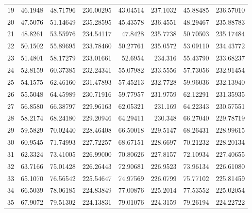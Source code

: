 \begin{table}[ht!]
{\begin{tabular}{@{}rrrrrrrr@{}}
19 & 46.1948 & 48.71796 & 236.00295 & 43.04514 & 237.1032 & 45.88485 & 236.57010 \\
20 & 47.5076 & 51.14649 & 235.28595 & 45.43578 & 236.4551 & 48.29467 & 235.88783 \\
21 & 48.8261 & 53.55976 & 234.54117 & 47.8428  & 235.7738 & 50.70503 & 235.17484 \\
22 & 50.1502 & 55.89695 & 233.78460 & 50.27761 & 235.0572 & 53.09110 & 234.43772 \\
23 & 51.4801 & 58.17279 & 233.01661 & 52.6954  & 234.316  & 55.43790 & 233.68237 \\
24 & 52.8159 & 60.37385 & 232.24341 & 55.07982 & 233.5556 & 57.73056 & 232.91454 \\
25 & 54.1575 & 62.46160 & 231.47893 & 57.45213 & 232.7728 & 59.96036 & 232.13940 \\
26 & 55.5048 & 64.45989 & 230.71916 & 59.77957 & 231.9759 & 62.12291 & 231.35935 \\
27 & 56.8580 & 66.38797 & 229.96163 & 62.05321 & 231.169  & 64.22343 & 230.57551 \\
28 & 58.2174 & 68.24180 & 229.20946 & 64.29411 & 230.348  & 66.27040 & 229.78719 \\
29 & 59.5829 & 70.02440 & 228.46408 & 66.50018 & 229.5147 & 68.26431 & 228.99615 \\
30 & 60.9545 & 71.74993 & 227.72257 & 68.67151 & 228.6697 & 70.21232 & 228.20134 \\
31 & 62.3324 & 73.41005 & 226.99000 & 70.80626 & 227.8157 & 72.10934 & 227.40655 \\
32 & 63.7166 & 75.01428 & 226.26443 & 72.90681 & 226.9523 & 73.96134 & 226.61080 \\
33 & 65.1070 & 76.56542 & 225.54647 & 74.97569 & 226.0799 & 75.77102 & 225.81459 \\
34 & 66.5039 & 78.06185 & 224.83849 & 77.00876 & 225.2014 & 77.53552 & 225.02054 \\
35 & 67.9072 & 79.51302 & 224.13831 & 79.01076 & 224.3159 & 79.26194 & 224.22722 \\ \bottomrule
\end{tabular}%
}
\end{table}

